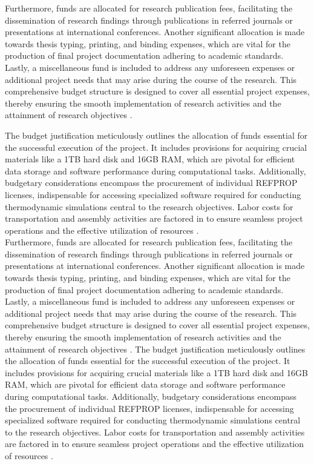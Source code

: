 \documentclass[10pt]{article}
\begin{document}
Furthermore, funds are allocated for research publication fees, facilitating the dissemination of research findings through publications in referred journals or presentations at international conferences. Another significant allocation is made towards thesis typing, printing, and binding expenses, which are vital for the production of final project documentation adhering to academic standards. Lastly, a miscellaneous fund is included to address any unforeseen expenses or additional project needs that may arise during the course of the research. This comprehensive budget structure is designed to cover all essential project expenses, thereby ensuring the smooth implementation of research activities and the attainment of research objectives \citep{auld2013organic}.

The budget justification meticulously outlines the allocation of funds essential for the successful execution of the project. It includes provisions for acquiring crucial materials like a 1TB hard disk and 16GB RAM, which are pivotal for efficient data storage and software performance during computational tasks. Additionally, budgetary considerations encompass the procurement of individual REFPROP licenses, indispensable for accessing specialized software required for conducting thermodynamic simulations central to the research objectives. Labor costs for transportation and assembly activities are factored in to ensure seamless project operations and the effective utilization of resources \citep{yamamoto2001design}. \\

Furthermore, funds are allocated for research publication fees, facilitating the dissemination of research findings through publications in referred journals or presentations at international conferences. Another significant allocation is made towards thesis typing, printing, and binding expenses, which are vital for the production of final project documentation adhering to academic standards. Lastly, a miscellaneous fund is included to address any unforeseen expenses or additional project needs that may arise during the course of the research. This comprehensive budget structure is designed to cover all essential project expenses, thereby ensuring the smooth implementation of research activities and the attainment of research objectives \citep{auld2013organic}.
The budget justification meticulously outlines the allocation of funds essential for the successful execution of the project. It includes provisions for acquiring crucial materials like a 1TB hard disk and 16GB RAM, which are pivotal for efficient data storage and software performance during computational tasks. Additionally, budgetary considerations encompass the procurement of individual REFPROP licenses, indispensable for accessing specialized software required for conducting thermodynamic simulations central to the research objectives. Labor costs for transportation and assembly activities are factored in to ensure seamless project operations and the effective utilization of resources \citep{yamamoto2001design}. \\
\end{document}
